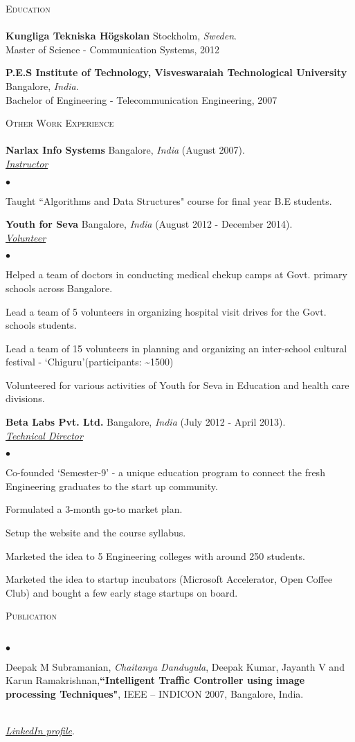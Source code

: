 \documentclass[a4paper]{article}
\newcommand{\lineunder}{\vspace*{-8pt} \\ \hspace*{-18pt} \hrulefill \\}
\newcommand{\header}[1]{{\hspace*{-15pt}\vspace*{6pt} \textsc{#1}} \vspace*{-6pt} \lineunder}
\newcommand{\employer}[4]{{ \textbf{#1} #2  (#3).\\ \underline{\emph{#4}}\\  }}
\newenvironment{achievements}{\begin{list}{$\bullet$}{\topsep 0pt \itemsep -2pt}}{\vspace*{4pt}\end{list}}
\newcommand{\school}[3]{
 \textbf{#1} #2 \\\vspace*{3pt} #3\\
\vspace*{5pt}
}
\begin{document}
\break
\header{Education}

\school{Kungliga Tekniska H\"{o}gskolan}{Stockholm, \textit{Sweden}.}
{Master of Science - Communication Systems, 2012}

\school{P.E.S Institute of Technology, Visveswaraiah Technological University}{Bangalore, \textit{India}.}{Bachelor of Engineering - Telecommunication Engineering, 2007}

\header{Other Work Experience}
\employer{Narlax Info Systems} {Bangalore, \textit{India}}{August 2007}{Instructor}
	\begin{achievements}
	\item Taught ``Algorithms and Data Structures" course for final year B.E students.
	\end{achievements}

\employer{Youth for Seva}{Bangalore, \textit{India}}{August 2012 - December 2014}{Volunteer}
\begin{achievements}
\item Helped a team of doctors in conducting medical chekup camps at Govt. primary schools across Bangalore.
\item Lead a team of 5 volunteers in organizing hospital visit drives for the Govt. schools students.
\item Lead a team of 15 volunteers in planning and organizing an inter-school cultural festival - `Chiguru'(participants: \textasciitilde 1500)
\item Volunteered for various activities of Youth for Seva in Education and health care divisions.
\end{achievements}

\employer{Beta Labs Pvt. Ltd.}{Bangalore, \textit{India}}{July 2012 - April 2013}{Technical Director}
\begin{achievements}
\item Co-founded `Semester-9' - a unique education program to connect the fresh Engineering graduates to the start up community.
\item Formulated a 3-month go-to market plan.
\item Setup the website and the course syllabus.
\item Marketed the idea to 5 Engineering colleges with around 250 students.
\item Marketed the idea to startup incubators (Microsoft Accelerator, Open Coffee Club) and bought a few early stage startups on board.
\end{achievements}

\header{Publication}
\begin{achievements}
\item  Deepak M Subramanian, \emph{Chaitanya Dandugula}, Deepak Kumar, Jayanth V and Karun Ramakrishnan,\textbf{``Intelligent Traffic Controller using image processing Techniques"}, IEEE – INDICON 2007, Bangalore, India.
\end{achievements}

\hspace*{-18pt} \hrulefill \\
\textit{\href{http://se.linkedin.com/in/dandugula}{LinkedIn profile}}.\\
\end{document}
